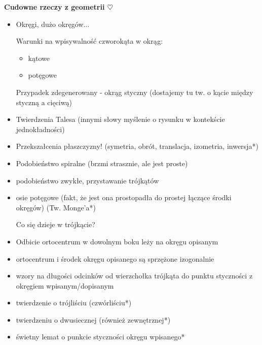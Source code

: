 \documentclass[12pt,a4paper]{article}
\begin{document}
\begin{center}
    \large{\textbf{Cudowne rzeczy z geometrii $\heartsuit$}}
\end{center}

\renewcommand{\labelitemi}{$\heartsuit$}

\begin{small}
\begin{itemize}
    \item Okręgi, dużo okręgów...
    
    Warunki na wpisywalność czworokąta w okrąg:
    \begin{itemize}
        \item kątowe
        \item potęgowe
    \end{itemize}
    
    Przypadek zdegenerowany - okrąg styczny (dostajemy tu tw. o kącie między styczną a cięciwą)
    
    \item Twierdzenia Talesa (innymi słowy myślenie o rysunku w kontekście jednokładności)
    
    \item Przekszałcenia płaszczyzny! (symetria, obrót, translacja, izometria, inwersja*)
    
    \item Podobieństwo spiralne (brzmi strasznie, ale jest proste)
    
    \item podobieństwo zwykłe, przystawanie trójkątów
    
    \item osie potęgowe (fakt, że jest ona prostopadła do prostej łączące środki okręgów) (Tw. Monge'a*)
    \newline
    
    Co się dzieje w trójkącie?
    
    \item Odbicie ortocentrum w dowolnym boku leży na okręgu opisanym
    
    \item ortocentrum i środek okręgu opisanego są sprzężone izogonalnie
    
    \item wzory na długości odcinków od wierzchołka trójkąta do punktu styczności z okręgiem wpisanym/dopisanym
    
    \item twierdzenie o trójliściu (czwórliściu*)
    
    \item twierdzeniu o dwusiecznej (również zewnętrznej*)
    
    \item świetny lemat o punkcie styczności okręgu wpisanego*
    
\end{itemize}
\end{small}
\end{document}
